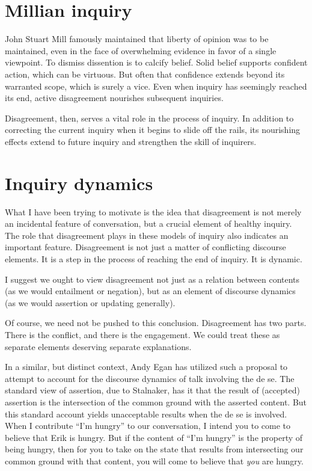 \documentclass[letterpaper,10pt]{article}
\begin{document}
\section{Millian inquiry}

John Stuart Mill famously maintained that liberty of opinion was to be maintained, even in the face of overwhelming evidence in favor of a single viewpoint.  To dismiss dissention is to calcify belief.  Solid belief supports confident action, which can be virtuous.  But often that confidence extends beyond its warranted scope, which is surely a vice.  Even when inquiry has seemingly reached its end, active disagreement nourishes subsequent inquiries.

Disagreement, then, serves a vital role in the process of inquiry.  In addition to correcting the current inquiry when it begins to slide off the rails, its nourishing effects extend to future inquiry and strengthen the skill of inquirers.

\section{Inquiry dynamics}

What I have been trying to motivate is the idea that disagreement is not merely an incidental feature of conversation, but a crucial element of healthy inquiry.  The role that disagreement plays in these models of inquiry also indicates an important feature.  Disagreement is not just a matter of conflicting discourse elements.  It is a step in the process of reaching the end of inquiry.  It is dynamic.

I suggest we ought to view disagreement not just as a relation between contents (as we would entailment or negation), but as an element of discourse dynamics (as we would assertion or updating generally).

Of course, we need not be pushed to this conclusion.  Disagreement has two parts.  There is the conflict, and there is the engagement.  We could treat these as separate elements deserving separate explanations.  

In a similar, but distinct context, Andy Egan has utilized such a proposal to attempt to account for the discourse dynamics of talk involving the de se.  The standard view of assertion, due to Stalnaker, has it that the result of (accepted) assertion is the intersection of the common ground with the asserted content. But this standard account yields unacceptable results when the de se is involved.  When I contribute ``I'm hungry'' to our conversation, I intend you to come to believe that Erik is hungry.  But if the content of ``I'm hungry'' is the property of being hungry, then for you to take on the state that results from intersecting our common ground with that content, you will come to believe that \textit{you} are hungry.
\end{document}
